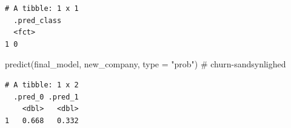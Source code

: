 \documentclass[
  11pt,
  letterpaper,
  DIV=11,
  numbers=noendperiod]{scrartcl}
\newenvironment{Shaded}{\begin{snugshade}}{\end{snugshade}}
\newcommand{\AttributeTok}[1]{\textcolor[rgb]{0.40,0.45,0.13}{#1}}
\newcommand{\CommentTok}[1]{\textcolor[rgb]{0.37,0.37,0.37}{#1}}
\newcommand{\FunctionTok}[1]{\textcolor[rgb]{0.28,0.35,0.67}{#1}}
\newcommand{\NormalTok}[1]{\textcolor[rgb]{0.00,0.23,0.31}{#1}}
\newcommand{\StringTok}[1]{\textcolor[rgb]{0.13,0.47,0.30}{#1}}
\begin{document}
\begin{verbatim}
# A tibble: 1 x 1
  .pred_class
  <fct>      
1 0          
\end{verbatim}

\begin{Shaded}
\begin{Highlighting}[]
\FunctionTok{predict}\NormalTok{(final\_model, new\_company, }\AttributeTok{type =} \StringTok{"prob"}\NormalTok{)     }\CommentTok{\# churn{-}sandsynlighed}
\end{Highlighting}
\end{Shaded}

\begin{verbatim}
# A tibble: 1 x 2
  .pred_0 .pred_1
    <dbl>   <dbl>
1   0.668   0.332
\end{verbatim}
\end{document}
